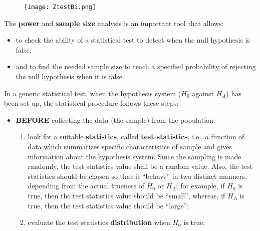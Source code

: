 \begin{frame}
  \begin{figure}
    \centering
    \texttt{[image: ZtestBi.png]}
  \end{figure}
\end{frame}

\begin{frame}
  \vspace*{.5cm}
  The \textbf{power} and \textbf{sample size} analysis is an important tool that allows:
  \begin{itemize}
    \vspace*{.75cm}
    \item to check the ability of a statistical test to detect when the null hypothesis is false,
    \vspace*{.75cm}
    \item and to find the needed sample size to reach a specified probability of rejecting the null hypothesis when it is false.
  \end{itemize}
\end{frame}

\begin{frame}
  \vspace*{.25cm}
  In a generic statistical test, when the hypothesis system ($H_0$ against $H_A$) has been set up, the statistical procedure follows these steps:
  \begin{itemize}
    \vspace*{.25cm}
    \item[\checkmark] \textbf{BEFORE} collecting the data (the sample) from the population:
    \begin{enumerate}
    \vspace*{.25cm}
      \item look for a suitable \textbf{statistics}, called \textbf{test statistics}, i.e., a function of data which summarizes specific characteristics of sample and gives information about the hypothesis system. Since the sampling is made randomly, the test statistics value shall be a random value. Also, the test statistics should be chosen so that it ``behave'' in two distinct manners, depending from the actual trueness of $H_0$ or $ H_A $; for example, if $H_0$ is true, then the test statistics value should be ``small'', whereas, if $ H_A $ is true, then the test statistics value should be ``large'';
      \vspace*{.25cm}
      \item evaluate the test statistics \textbf{distribution} when $H_0$ is true;
    \end{enumerate}
  \end{itemize}
\end{frame}

